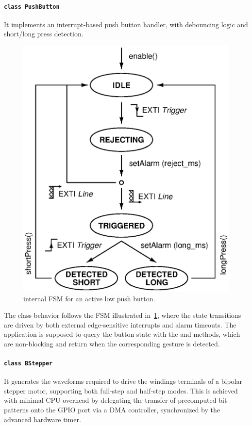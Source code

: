 \paragraph{\texttt{class PushButton}}
It implements an interrupt-based push button handler, with debouncing logic and short/long press detection.

\begin{figure}
    \centering
    \includegraphics[width=.5\linewidth]{../gfx/PushButton_fsm.eps}
    \caption{ internal FSM for an active low push button.}
    \label{fig:pb_fsm}
\end{figure}

The class behavior follows the FSM illustrated in~\cref{fig:pb_fsm}, where the state transitions are driven by both external edge-sensitive interrupts and alarm timeouts. 
The application is supposed to query the button state with the  and  methods, which are non-blocking and return  when the corresponding gesture is detected.

\paragraph{\texttt{class BStepper}}
It generates the waveforms required to drive the windings terminals of a bipolar stepper motor, supporting both full-step and half-step modes. This is achieved with minimal CPU overhead by delegating the transfer of precomputed bit patterns onto the GPIO port via a DMA controller, synchronized by the advanced hardware timer.

